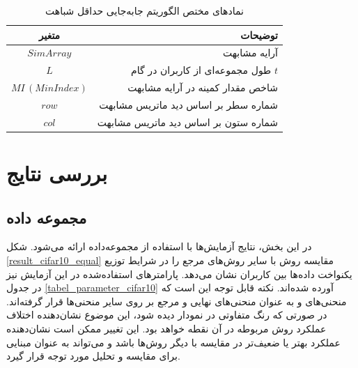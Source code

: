 \begin{table}[h]
	\centering
	\caption{نمادهای مختص الگوریتم جابه‌جایی حداقل شباهت}
	\label{tabel_MinSimilaritySwapNotations}
	\begin{tabular}{cr}
		\hline
		متغیر & توضیحات \\
		\hline
		$SimArray$ & آرایه مشابهت \\
		$L$ & طول مجموعه‌ای از کاربران در گام $t$ \\
		$MI \, (MinIndex)$ & شاخص مقدار کمینه در آرایه مشابهت \\
		$row$ & شماره سطر بر اساس دید ماتریس مشابهت \\
		$col$ & شماره ستون بر اساس دید ماتریس مشابهت
	\end{tabular}
\end{table}








\section{بررسی نتایج}
\subsection{
	مجموعه داده
}
در این بخش، نتایج آزمایش‌ها با استفاده از مجموعه‌داده  
ارائه می‌شود. شکل  
\ref{result_cifar10_equal}  
مقایسه روش  
با سایر روش‌های مرجع را در شرایط توزیع یکنواخت داده‌ها بین کاربران نشان می‌دهد. پارامترهای استفاده‌شده در این آزمایش نیز در جدول  
\ref{tabel_parameter_cifar10}  
آورده شده‌اند.
نکته قابل توجه این است که منحنی‌های
و
به عنوان منحنی‌های نهایی و مرجع بر روی سایر منحنی‌ها قرار گرفته‌اند. در صورتی که رنگ متفاوتی در نمودار دیده شود، این موضوع نشان‌دهنده اختلاف عملکرد روش مربوطه در آن نقطه خواهد بود. این تغییر ممکن است نشان‌دهنده عملکرد بهتر یا ضعیف‌تر در مقایسه با دیگر روش‌ها باشد و می‌تواند به عنوان مبنایی برای مقایسه و تحلیل مورد توجه قرار گیرد.



